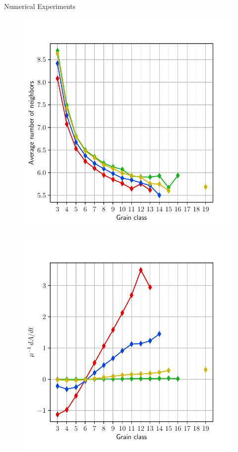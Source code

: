 \documentclass[usenames,dvipsnames]{beamer}
\begin{document}
\begin{frame}{Numerical Experiments}
\begin{minipage}{0.5\textwidth}
\begin{figure}
    \includegraphics[scale=0.45]{figures/coupled_model/new_data/avg.pdf}
\end{figure}
\end{minipage}%
\begin{minipage}{0.5\textwidth}
\begin{figure}
    \includegraphics[scale=0.45]{figures/coupled_model/new_data/dAdt.pdf}
\end{figure}
\end{minipage}
\end{frame}
\end{document}
